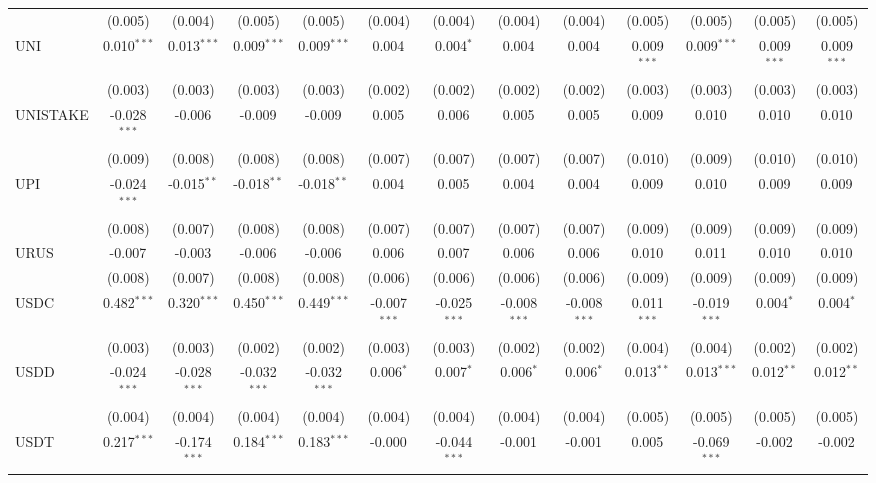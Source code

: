 \begin{table}[!htbp]
\begin{tabular}{@{\extracolsep{5pt}}lcccccccccccc}
  & (0.005) & (0.004) & (0.005) & (0.005) & (0.004) & (0.004) & (0.004) & (0.004) & (0.005) & (0.005) & (0.005) & (0.005) \\
 UNI & 0.010$^{***}$ & 0.013$^{***}$ & 0.009$^{***}$ & 0.009$^{***}$ & 0.004$^{}$ & 0.004$^{*}$ & 0.004$^{}$ & 0.004$^{}$ & 0.009$^{***}$ & 0.009$^{***}$ & 0.009$^{***}$ & 0.009$^{***}$ \\
  & (0.003) & (0.003) & (0.003) & (0.003) & (0.002) & (0.002) & (0.002) & (0.002) & (0.003) & (0.003) & (0.003) & (0.003) \\
 UNISTAKE & -0.028$^{***}$ & -0.006$^{}$ & -0.009$^{}$ & -0.009$^{}$ & 0.005$^{}$ & 0.006$^{}$ & 0.005$^{}$ & 0.005$^{}$ & 0.009$^{}$ & 0.010$^{}$ & 0.010$^{}$ & 0.010$^{}$ \\
  & (0.009) & (0.008) & (0.008) & (0.008) & (0.007) & (0.007) & (0.007) & (0.007) & (0.010) & (0.009) & (0.010) & (0.010) \\
 UPI & -0.024$^{***}$ & -0.015$^{**}$ & -0.018$^{**}$ & -0.018$^{**}$ & 0.004$^{}$ & 0.005$^{}$ & 0.004$^{}$ & 0.004$^{}$ & 0.009$^{}$ & 0.010$^{}$ & 0.009$^{}$ & 0.009$^{}$ \\
  & (0.008) & (0.007) & (0.008) & (0.008) & (0.007) & (0.007) & (0.007) & (0.007) & (0.009) & (0.009) & (0.009) & (0.009) \\
 URUS & -0.007$^{}$ & -0.003$^{}$ & -0.006$^{}$ & -0.006$^{}$ & 0.006$^{}$ & 0.007$^{}$ & 0.006$^{}$ & 0.006$^{}$ & 0.010$^{}$ & 0.011$^{}$ & 0.010$^{}$ & 0.010$^{}$ \\
  & (0.008) & (0.007) & (0.008) & (0.008) & (0.006) & (0.006) & (0.006) & (0.006) & (0.009) & (0.009) & (0.009) & (0.009) \\
 USDC & 0.482$^{***}$ & 0.320$^{***}$ & 0.450$^{***}$ & 0.449$^{***}$ & -0.007$^{***}$ & -0.025$^{***}$ & -0.008$^{***}$ & -0.008$^{***}$ & 0.011$^{***}$ & -0.019$^{***}$ & 0.004$^{*}$ & 0.004$^{*}$ \\
  & (0.003) & (0.003) & (0.002) & (0.002) & (0.003) & (0.003) & (0.002) & (0.002) & (0.004) & (0.004) & (0.002) & (0.002) \\
 USDD & -0.024$^{***}$ & -0.028$^{***}$ & -0.032$^{***}$ & -0.032$^{***}$ & 0.006$^{*}$ & 0.007$^{*}$ & 0.006$^{*}$ & 0.006$^{*}$ & 0.013$^{**}$ & 0.013$^{***}$ & 0.012$^{**}$ & 0.012$^{**}$ \\
  & (0.004) & (0.004) & (0.004) & (0.004) & (0.004) & (0.004) & (0.004) & (0.004) & (0.005) & (0.005) & (0.005) & (0.005) \\
 USDT & 0.217$^{***}$ & -0.174$^{***}$ & 0.184$^{***}$ & 0.183$^{***}$ & -0.000$^{}$ & -0.044$^{***}$ & -0.001$^{}$ & -0.001$^{}$ & 0.005$^{}$ & -0.069$^{***}$ & -0.002$^{}$ & -0.002$^{}$ \\

\end{tabular}
\end{table}
